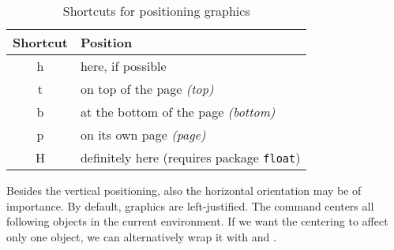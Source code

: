 \begin{table}[h!]
	\centering
	\begin{tabular}{cl}
		\toprule
		Shortcut & Position                              \\
		\midrule
		h      & here, if possible						\\
		t      & on top of the page \emph{(top)}        \\
		b      & at the bottom of the page \emph{(bottom)}    \\
		p      & on its own page \emph{(page)} \\
		H      & definitely here (requires package \texttt{float}) \\
		\bottomrule
	\end{tabular}
	\caption{Shortcuts for positioning graphics}
	\label{tbl:placement-abbreviations}
\end{table}


Besides the vertical positioning, also the horizontal orientation may be of importance. 
By default, graphics are left-justified. 
The command  centers all following objects in the current environment.
If we want the centering to affect only one object, we can alternatively wrap it with  and .
